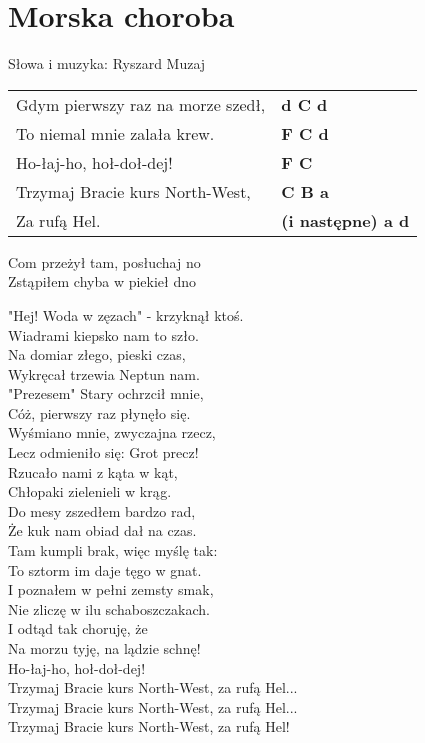 \section{Morska choroba}

Słowa i muzyka: Ryszard Muzaj

\vspace{2em}
\begin{tabular}{@{}p{7cm}@{}l@{}}
Gdym pierwszy raz na morze szedł, & \bfseries  d C d \\
To niemal mnie zalała krew. & \bfseries  F C d \\
Ho-łaj-ho, hoł-doł-dej! & \bfseries  F C \\
Trzymaj Bracie kurs North-West, & \bfseries  C B a \\
Za rufą Hel. & \bfseries  (i następne) a d \\
\end{tabular}

\vspace{1em}
Com przeżył tam, posłuchaj no \\
Zstąpiłem chyba w piekieł dno \\

\begin{multicols}{2}
"Hej! Woda w zęzach" - krzyknął ktoś. \\
Wiadrami kiepsko nam to szło. \\

Na domiar złego, pieski czas, \\
Wykręcał trzewia Neptun nam. \\

"Prezesem" Stary ochrzcił mnie, \\
Cóż, pierwszy raz płynęło się. \\

Wyśmiano mnie, zwyczajna rzecz, \\
Lecz odmieniło się: Grot precz! \\

Rzucało nami z kąta w kąt, \\
Chłopaki zielenieli w krąg. \\

Do mesy zszedłem bardzo rad, \\
Że kuk nam obiad dał na czas. \\

\columnbreak
Tam kumpli brak, więc myślę tak: \\
To sztorm im daje tęgo w gnat. \\

I poznałem w pełni zemsty smak, \\
Nie zliczę w ilu schaboszczakach. \\

I odtąd tak choruję, że \\
Na morzu tyję, na lądzie schnę! \\
Ho-łaj-ho, hoł-doł-dej! \\

Trzymaj Bracie kurs North-West, za rufą Hel... \\
Trzymaj Bracie kurs North-West, za rufą Hel... \\
Trzymaj Bracie kurs North-West, za rufą Hel!
\end{multicols}